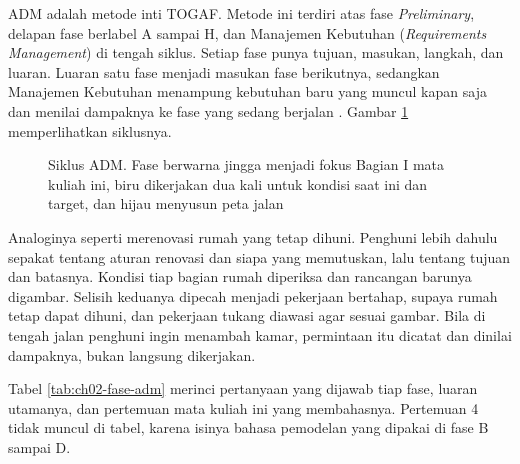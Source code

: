ADM adalah metode inti TOGAF. Metode ini terdiri atas fase
\textit{Preliminary}, delapan fase berlabel A sampai H, dan Manajemen
Kebutuhan (\textit{Requirements Management}) di tengah siklus. Setiap fase
punya tujuan, masukan, langkah, dan luaran. Luaran satu fase menjadi masukan
fase berikutnya, sedangkan Manajemen Kebutuhan menampung kebutuhan baru yang
muncul kapan saja dan menilai dampaknya ke fase yang sedang berjalan
\cite{togaf10, c02-togaf-pocket}. Gambar \ref{fig:ch02-siklus-adm}
memperlihatkan siklusnya.

\begin{figure}[!htb]
  \centering
  
  \caption{Siklus ADM. Fase berwarna jingga menjadi fokus Bagian I mata kuliah
           ini, biru dikerjakan dua kali untuk kondisi saat ini dan target,
           dan hijau menyusun peta jalan}
  \label{fig:ch02-siklus-adm}
\end{figure}

Analoginya seperti merenovasi rumah yang tetap dihuni. Penghuni lebih dahulu
sepakat tentang aturan renovasi dan siapa yang memutuskan, lalu tentang
tujuan dan batasnya. Kondisi tiap bagian rumah diperiksa dan rancangan
barunya digambar. Selisih keduanya dipecah menjadi pekerjaan bertahap,
supaya rumah tetap dapat dihuni, dan pekerjaan tukang diawasi agar sesuai
gambar. Bila di tengah jalan penghuni ingin menambah kamar, permintaan itu
dicatat dan dinilai dampaknya, bukan langsung dikerjakan.

Tabel \ref{tab:ch02-fase-adm} merinci pertanyaan yang dijawab tiap fase,
luaran utamanya, dan pertemuan mata kuliah ini yang membahasnya. Pertemuan 4
tidak muncul di tabel, karena isinya bahasa pemodelan yang dipakai di fase B
sampai D.

